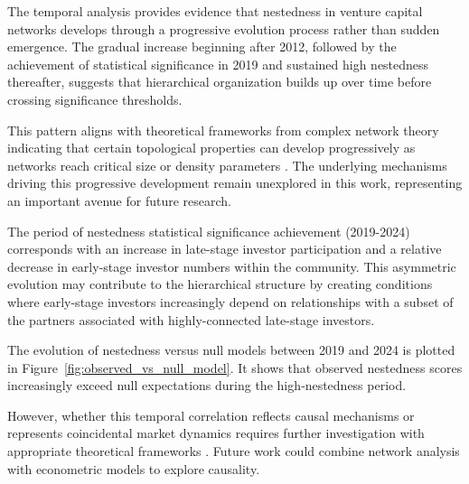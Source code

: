 The temporal analysis provides evidence that nestedness in venture capital networks develops through a progressive evolution process rather than sudden emergence. The gradual increase beginning after 2012, followed by the achievement of statistical significance in 2019 and sustained high nestedness thereafter, suggests that hierarchical organization builds up over time before crossing significance thresholds. 

This pattern aligns with theoretical frameworks from complex network theory indicating that certain topological properties can develop progressively as networks reach critical size or density parameters \cite{Mariani2019}. The underlying mechanisms driving this progressive development remain unexplored in this work, representing an important avenue for future research.

The period of nestedness statistical significance achievement (2019-2024) corresponds with an increase in late-stage investor participation and a relative decrease in early-stage investor numbers within the community. This asymmetric evolution may contribute to the hierarchical structure by creating conditions where early-stage investors increasingly depend on relationships with a subset of the partners associated with highly-connected late-stage investors. 

The evolution of nestedness versus null models between 2019 and 2024 is plotted in Figure~\ref{fig:observed_vs_null_model}.  It shows that observed nestedness scores increasingly exceed null expectations during the high‑nestedness period.

However, whether this temporal correlation reflects causal mechanisms or represents coincidental market dynamics requires further investigation with appropriate theoretical frameworks \cite{Mariani2019}.  Future work could combine network analysis with econometric models to explore causality.

\pagebreak